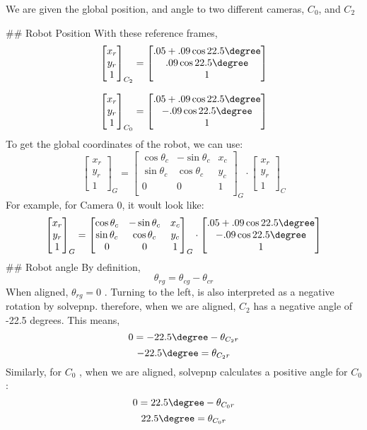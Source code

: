 We are given the global position, and angle to two different cameras, $C_0$, and $C_2$


## Robot Position
With these reference frames, 
$$
\begin{bmatrix}  
x_r\\  
y_r\\
1
\end{bmatrix}_{C_2}
=
\begin{bmatrix}
.05 + .09 \cos22.5\degree \\
.09 \cos22.5\degree \\
1
\end{bmatrix}
$$

$$
\begin{bmatrix}  
x_r\\  
y_r\\
1
\end{bmatrix}_{C_0}
=
\begin{bmatrix}
.05 + .09 \cos22.5\degree \\
-.09 \cos22.5\degree \\
1
\end{bmatrix}
$$
To get the global coordinates of the robot, we can use:
$$
\begin{bmatrix}  
x_r\\  
y_r\\
1
\end{bmatrix}_{G}
=
\begin{bmatrix}
\cos \theta_c & -\sin\theta_c & x_c\\
\sin \theta_c & \cos\theta_c & y_c\\
0 & 0 & 1\\
\end{bmatrix}_G \cdot
\begin{bmatrix}
x_r\\
y_r\\
1
\end{bmatrix}_C
$$
For example, for Camera 0, it woult look like:
$$
\begin{bmatrix}  
x_r\\  
y_r\\
1
\end{bmatrix}_{G}
=
\begin{bmatrix}
\cos \theta_c & -\sin\theta_c & x_c\\
\sin \theta_c & \cos\theta_c & y_c\\
0 & 0 & 1\\
\end{bmatrix}_G \cdot
\begin{bmatrix}
.05 + .09 \cos22.5\degree \\
-.09 \cos22.5\degree \\
1
\end{bmatrix}
$$
## Robot angle
By definition,
$$\theta_{rg} = \theta_{cg} - \theta_{cr}$$
When aligned, $\theta_{rg} = 0$ . Turning to the left, is also interpreted as a negative rotation by solvepnp. therefore, when we are aligned, $C_2$ has a negative angle of -22.5 degrees. This means,
$$0 = -22.5\degree - \theta_{C_2r}$$
$$-22.5\degree = \theta_{C_2r}$$
Similarly, for $C_0$ , when we are aligned, solvepnp calculates  a positive angle for $C_0$ :
$$0 = 22.5\degree - \theta_{C_0r}$$
$$22.5\degree = \theta_{C_0r}$$
